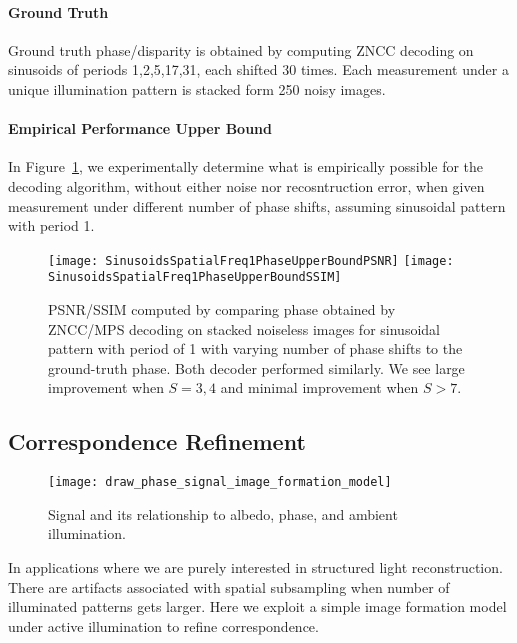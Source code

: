 \documentclass[../writeup.tex]{subfiles}
\begin{document}
\paragraph{Ground Truth} Ground truth phase/disparity is obtained by computing ZNCC decoding on sinusoids of periods 1,2,5,17,31, each shifted 30 times. Each measurement under a unique illumination pattern is stacked form 250 noisy images. 

\paragraph{Empirical Performance Upper Bound} In Figure~\ref{fig:sinusiods_spatial_freq_1_phase_upper_bound_wrt_S}, we experimentally determine what is empirically possible for the decoding algorithm, without either noise nor recosntruction error, when given measurement under different number of phase shifts, assuming sinusoidal pattern with period 1.
\begin{figure}[h!]
    \begin{center}
        \texttt{[image: SinusoidsSpatialFreq1PhaseUpperBoundPSNR]}
        \texttt{[image: SinusoidsSpatialFreq1PhaseUpperBoundSSIM]}
        \caption{PSNR/SSIM computed by comparing phase obtained by ZNCC/MPS decoding on stacked noiseless images for sinusoidal pattern with period of 1 with varying number of phase shifts to the ground-truth phase. Both decoder performed similarly. We see large improvement when $S=3,4$ and minimal improvement when $S>7$.}
        \label{fig:sinusiods_spatial_freq_1_phase_upper_bound_wrt_S}
    \end{center}
\end{figure}  
 
\subsection{Correspondence Refinement}

\begin{figure}[h!]
    \begin{center}
        \texttt{[image: draw\_phase\_signal\_image\_formation\_model]}
        \caption{Signal and its relationship to albedo, phase, and ambient illumination.}
        \label{fig:draw_phase_signal_image_formation_model}
    \end{center}
\end{figure}  
In applications where we are purely interested in structured light reconstruction. There are artifacts associated with spatial subsampling when number of illuminated patterns gets larger. Here we exploit a simple image formation model under active illumination to refine correspondence.
\end{document}
